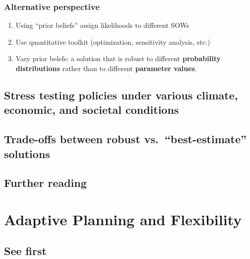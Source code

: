 \documentclass[
  letterpaper,
  DIV=11,
  numbers=noendperiod]{scrreprt}
\providecommand{\tightlist}{%
  \setlength{\itemsep}{0pt}\setlength{\parskip}{0pt}}
\begin{document}
\subsection{Alternative perspective}\label{alternative-perspective}

\begin{enumerate}
\def\labelenumi{\arabic{enumi}.}
\tightlist
\item
  Using ``prior beliefs'' assign likelihoods to different SOWs
\item
  Use quantitative toolkit (optimization, sensitivity analysis, etc.)
\item
  Vary prior belefs: a solution that is robust to different
  \textbf{probability distributions} rather than to different
  \textbf{parameter values}.
\end{enumerate}

\section{Stress testing policies under various climate, economic, and
societal
conditions}\label{stress-testing-policies-under-various-climate-economic-and-societal-conditions}

\section{Trade-offs between robust vs.~``best-estimate''
solutions}\label{trade-offs-between-robust-vs.-best-estimate-solutions}

\section*{Further reading}\label{further-reading-18}


\chapter{Adaptive Planning and Flexibility
🚧}\label{adaptive-planning-and-flexibility}

\section*{See first}\label{see-first-14}

\end{document}
